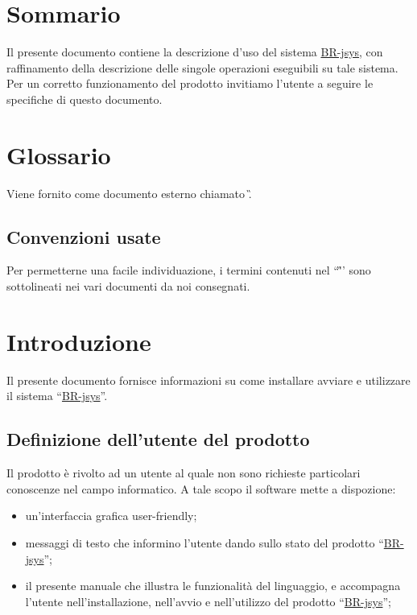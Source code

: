 \tableofcontents 
\chapter*{Sommario}
Il presente documento contiene la descrizione d'uso del sistema \underline{BR-jsys}, con raffinamento della descrizione delle singole operazioni eseguibili su tale sistema. Per un corretto funzionamento del prodotto invitiamo l'utente a seguire le specifiche di questo documento.

\chapter*{Glossario}
Viene fornito come documento esterno chiamato \G. 
\section*{Convenzioni usate}
Per permetterne una facile individuazione, i termini contenuti nel ``\G'' sono sottolineati nei vari documenti da noi consegnati.

\chapter{Introduzione}
Il presente documento fornisce informazioni su come installare avviare e utilizzare il sistema ``\underline{BR-jsys}''.
\section{Definizione dell'utente del prodotto}
Il prodotto \`e rivolto ad un utente al quale non sono richieste particolari conoscenze nel campo informatico. A tale scopo il software mette a dispozione:
\begin{itemize}
\item un'interfaccia grafica user-friendly;
\item messaggi di testo che informino l'utente dando sullo stato del prodotto ``\underline{BR-jsys}'';
\item il presente manuale che illustra le funzionalit\`a del linguaggio, e accompagna l'utente nell'installazione, nell'avvio e nell'utilizzo del prodotto ``\underline{BR-jsys}'';
\end{itemize}

